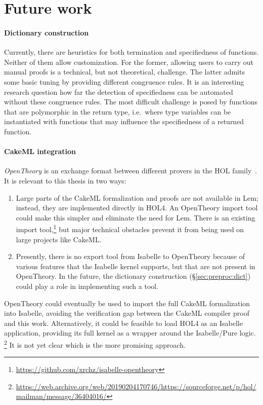 
\section{Future work}

\paragraph{Dictionary construction}
Currently, there are heuristics for both termination and specifiedness of functions.
Neither of them allow customization.
For the former, allowing users to carry out manual proofs is a technical, but not theoretical, challenge.
The latter admits some basic tuning by providing different congruence rules.
It is an interesting research question how far the detection of specifiedness can be automated without these congruence rules.
The most difficult challenge is posed by functions that are polymorphic in the return type, i.e.\ where type variables can be instantiated with functions that may influence the specifiedness of a returned function.

\paragraph{CakeML integration}
\emph{OpenTheory} is an exchange format between different provers in the HOL family~\cite{hurd2011opentheory}.
It is relevant to this thesis in two ways:
\begin{enumerate}
  \item
    Large parts of the CakeML formalization and proofs are not available in Lem; instead, they are implemented directly in HOL4.
    An OpenTheory import tool could make this simpler and eliminate the need for Lem.
    There is an existing import tool,\footnote{\url{https://github.com/xrchz/isabelle-opentheory}} but major technical obstacles prevent it from being used on large projects like CakeML.
  \item
    Presently, there is no export tool from Isabelle to OpenTheory because of various features that the Isabelle kernel supports, but that are not present in OpenTheory.
    In the future, the dictionary construction (§\ref{sec:preproc:dict}) could play a role in implementing such a tool.
\end{enumerate}

\noindent
OpenTheory could eventually be used to import the full CakeML formalization into Isabelle, avoiding the verification gap between the CakeML compiler proof and this work. Alternatively, it could be feasible to load HOL4 as an Isabelle application, providing its full kernel as a wrapper around the Isabelle/Pure logic.%
\footnote{\url{https://web.archive.org/web/20190204170746/https://sourceforge.net/p/hol/mailman/message/36404016/}}
It is not yet clear which is the more promising approach.

